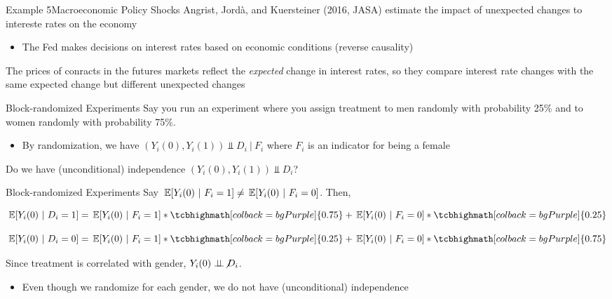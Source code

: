 \documentclass[aspectratio=169,t,11pt,table]{beamer}
\begin{document}
\begin{frame}{Example 5}{Macroeconomic Policy Shocks}
  Angrist, Jordà, and Kuersteiner (2016, JASA) estimate the impact of unexpected changes to intereste rates on the economy

  \begin{itemize}
    \item The Fed makes decisions on interest rates based on economic conditions (reverse causality)
  \end{itemize}

  \pause
  \bigskip
  The prices of conracts in the futures markets reflect the \emph{expected} change in interest rates, so they compare interest rate changes with the same expected change but different unexpected changes
\end{frame}


\begin{frame}{Block-randomized Experiments}
  Say you run an experiment where you assign treatment to men randomly with probability 25\% and to women randomly with probability 75\%. 
  \begin{itemize}
    \item By randomization, we have $ (Y_{i}(0), Y_{i}(1)) \Perp D_i \ \vert \ F_i$ where $F_i$ is an indicator for being a female
  \end{itemize}

  Do we have (unconditional) independence $(Y_{i}(0), Y_{i}(1)) \Perp D_i$?
\end{frame}

\begin{frame}{Block-randomized Experiments}
  Say $\expec{Y_i(0)}{F_i = 1} \neq \expec{Y_i(0)}{F_i = 0}$. 
  Then, 

  $$
    \expec{Y_i(0)}{D_i = 1} = \expec{Y_i(0)}{F_i = 1} * \tcbhighmath[colback = bgPurple]{0.75} + \expec{Y_i(0)}{F_i = 0} * \tcbhighmath[colback = bgPurple]{0.25}
  $$

  $$
    \expec{Y_i(0)}{D_i = 0} = \expec{Y_i(0)}{F_i = 1} * \tcbhighmath[colback = bgPurple]{0.25} + \expec{Y_i(0)}{F_i = 0} * \tcbhighmath[colback = bgPurple]{0.75}
  $$
  
  \pause
  \bigskip
  Since treatment is correlated with gender, $Y_{i}(0) \centernot{\Perp} D_i$.
  \begin{itemize}
    \item Even though we randomize for each gender, we do not have (unconditional) independence
  \end{itemize}
\end{frame}
\end{document}

